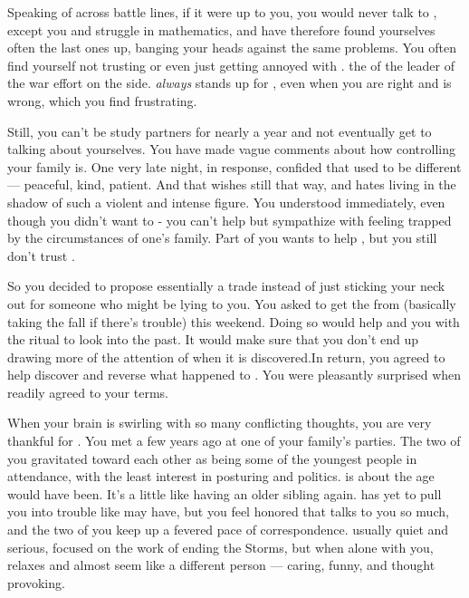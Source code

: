 \documentclass[char]{GL2020}
\begin{document}
Speaking of across battle lines, if it were up to you, you would never talk to \cWarlordDaughter{\full}, except you and \cWarlordDaughter{} struggle in mathematics, and have therefore found yourselves often the last ones up, banging your heads against the same problems. You often find yourself not trusting or even just getting annoyed with \cWarlordDaughter{}. \cWarlordDaughter{\They \are} the \cWarlordDaughter{\offspring} of the leader of the war effort on the \pShip{} side. \cPresident{} \emph{always} stands up for \cWarlordDaughter{\them}, even when you are right and \cWarlordDaughter{} is wrong, which you find frustrating. 

Still, you can’t be study partners for nearly a year and not eventually get to talking about yourselves.  You have made vague comments about how controlling your family is.  One very late night, in response,  \cWarlordDaughter{} confided that  \cWarlordDaughter{\their} \cLoud{\parent} used to be different — peaceful, kind, patient. And that \cWarlordDaughter{} wishes \cLoud{\they} \cLoud{\were} still that way, and hates living in the shadow of such a violent and intense figure. You understood immediately, even though you didn’t want to - you can’t help but sympathize with feeling trapped by the circumstances of one’s family. Part of you wants to help \cWarlordDaughter{} , but you still don’t trust \cWarlordDaughter{\them}. 

So you decided to propose essentially a trade instead of just sticking your neck out for someone who might be lying to you. You asked \cWarlordDaughter{} to get the \iMirror{} from \cDiplomat{} (basically taking the fall if there’s trouble) this weekend. Doing so would help \cPresident{} and you with the ritual to look into the past. It would make sure that you don’t end up drawing more of the attention of \cDiplomat{} when it is discovered.In return, you agreed to help \cWarlordDaughter{} discover and reverse what happened to \cWarlordDaughter{\their}  \cLoud{\parent} \cLoud{}. You were pleasantly surprised when \cWarlordDaughter{\they} readily agreed to your terms. 

When your brain is swirling with so many conflicting thoughts, you are very thankful for \cAssistantScientist{\full}. You met \cAssistantScientist{\them} a few years ago at one of your family’s parties. The two of you gravitated toward each other as being some of the youngest people in attendance, with the least interest in posturing and politics. \cAssistantScientist{} is about the age \cHeirSibling{} would have been. It's a little like having an older sibling again. \cAssistantScientist{} has yet to pull you into trouble like \cHeirSibling{} may have, but you feel honored that \cAssistantScientist{} talks to you so much, and the two of you keep up a fevered pace of correspondence. \cAssistantScientist{\They} \cAssistantScientist{\are} usually quiet and serious, focused on the work of ending the Storms, but when \cAssistantScientist{\they} \cAssistantScientist{\are} alone with you, \cAssistantScientist{\they} relaxes and almost seem\cAssistantScientist{\verbs} like a different person — caring, funny, and thought provoking. 
\end{document}

